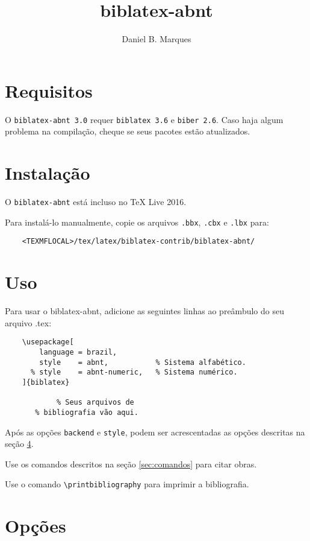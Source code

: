 \documentclass[a4paper]{article}
\title{biblatex-abnt \version}
\author{Daniel B. Marques}
\newcommand{\version}{3.0}
\newcommand{\requirements}{\texttt{biblatex 3.6} e \texttt{biber 2.6}}
\begin{document}
\maketitle

\tableofcontents

\clearpage
\section{Requisitos}

O \texttt{biblatex-abnt \version} requer \requirements. Caso haja algum
problema na compilação, cheque se seus pacotes estão atualizados.

\section{Instalação}

O \texttt{biblatex-abnt} está incluso no TeX Live 2016.

Para instalá-lo manualmente, copie os arquivos \texttt{.bbx}, \texttt{.cbx} e
\texttt{.lbx} para:
\begin{verbatim}
    <TEXMFLOCAL>/tex/latex/biblatex-contrib/biblatex-abnt/
\end{verbatim}

\section{Uso}

Para usar o {biblatex-abnt}, adicione as seguintes linhas ao preâmbulo do seu
arquivo {.tex}:

\begin{verbatim}
    \usepackage[
        language = brazil,
        style    = abnt,           % Sistema alfabético.
      % style    = abnt-numeric,   % Sistema numérico.
    ]{biblatex}

            % Seus arquivos de
       % bibliografia vão aqui.
\end{verbatim}

Após as opções \texttt{backend} e \texttt{style}, podem ser acrescentadas
as opções descritas na seção \ref{sec:opções}.

Use os comandos descritos na seção \ref{sec:comandos} para citar obras.

Use o comando \verb"\printbibliography" para imprimir a bibliografia.

\clearpage
\section{Opções}
\label{sec:opções}
\end{document}
